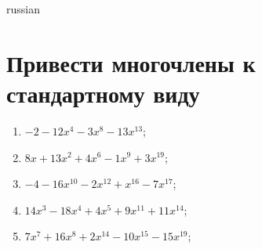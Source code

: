 \documentclass[a4paper]{article}
\begin{document}
\begin{otherlanguage*}{russian}

\section{Привести многочлены к стандартному виду}
\begin{enumerate}
\item $-2-12x^4-3x^8-13x^13$;
\item $8x + 13x^2 + 4x^6-1x^9 + 3x^19$;
\item $-4-16x^10-2x^12 + x^16-7x^17$;
\item $14x^3-18x^4 + 4x^5 + 9x^11 + 11x^14$;
\item $7x^7 + 16x^8 + 2x^14-10x^15-15x^19$;
\end{enumerate}
\end{otherlanguage*}
\end{document}
